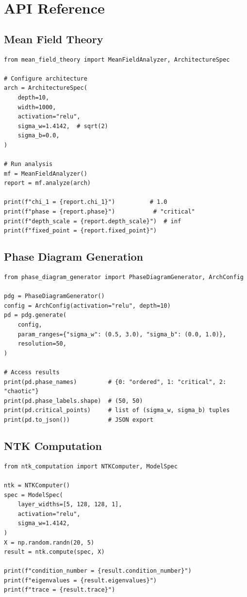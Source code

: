 \documentclass[10pt]{article}
\theoremstyle{definition}
\begin{document}
\section{API Reference}
\label{app:api}

\subsection{Mean Field Theory}

\begin{lstlisting}
from mean_field_theory import MeanFieldAnalyzer, ArchitectureSpec

# Configure architecture
arch = ArchitectureSpec(
    depth=10,
    width=1000,
    activation="relu",
    sigma_w=1.4142,  # sqrt(2)
    sigma_b=0.0,
)

# Run analysis
mf = MeanFieldAnalyzer()
report = mf.analyze(arch)

print(f"chi_1 = {report.chi_1}")          # 1.0
print(f"phase = {report.phase}")           # "critical"
print(f"depth_scale = {report.depth_scale}")  # inf
print(f"fixed_point = {report.fixed_point}")
\end{lstlisting}

\subsection{Phase Diagram Generation}

\begin{lstlisting}
from phase_diagram_generator import PhaseDiagramGenerator, ArchConfig

pdg = PhaseDiagramGenerator()
config = ArchConfig(activation="relu", depth=10)
pd = pdg.generate(
    config,
    param_ranges={"sigma_w": (0.5, 3.0), "sigma_b": (0.0, 1.0)},
    resolution=50,
)

# Access results
print(pd.phase_names)         # {0: "ordered", 1: "critical", 2: "chaotic"}
print(pd.phase_labels.shape)  # (50, 50)
print(pd.critical_points)     # list of (sigma_w, sigma_b) tuples
print(pd.to_json())           # JSON export
\end{lstlisting}

\subsection{NTK Computation}

\begin{lstlisting}
from ntk_computation import NTKComputer, ModelSpec

ntk = NTKComputer()
spec = ModelSpec(
    layer_widths=[5, 128, 128, 1],
    activation="relu",
    sigma_w=1.4142,
)
X = np.random.randn(20, 5)
result = ntk.compute(spec, X)

print(f"condition_number = {result.condition_number}")
print(f"eigenvalues = {result.eigenvalues}")
print(f"trace = {result.trace}")
\end{lstlisting}
\end{document}
